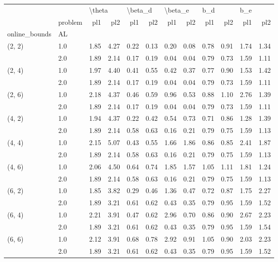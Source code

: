 \begin{tabular}{llrrrrrrrrrr}
\toprule
       & {} & \multicolumn{2}{l}{\textbackslash theta} & \multicolumn{2}{l}{\textbackslash beta\_d} & \multicolumn{2}{l}{\textbackslash beta\_e} & \multicolumn{2}{l}{b\_d} & \multicolumn{2}{l}{b\_e} \\
       & problem &    pl1 &  pl2 &     pl1 &  pl2 &     pl1 &  pl2 &  pl1 &  pl2 &  pl1 &  pl2 \\
online\_bounds & AL &        &      &         &      &         &      &      &      &      &      \\
\midrule
(2, 2) & 1.0 &   1.85 & 4.27 &    0.22 & 0.13 &    0.20 & 0.08 & 0.78 & 0.91 & 1.74 & 1.34 \\
       & 2.0 &   1.89 & 2.14 &    0.17 & 0.19 &    0.04 & 0.04 & 0.79 & 0.73 & 1.59 & 1.11 \\
(2, 4) & 1.0 &   1.97 & 4.40 &    0.41 & 0.55 &    0.42 & 0.37 & 0.77 & 0.90 & 1.53 & 1.42 \\
       & 2.0 &   1.89 & 2.14 &    0.17 & 0.19 &    0.04 & 0.04 & 0.79 & 0.73 & 1.59 & 1.11 \\
(2, 6) & 1.0 &   2.18 & 4.37 &    0.46 & 0.59 &    0.96 & 0.53 & 0.88 & 1.10 & 2.76 & 1.39 \\
       & 2.0 &   1.89 & 2.14 &    0.17 & 0.19 &    0.04 & 0.04 & 0.79 & 0.73 & 1.59 & 1.11 \\
(4, 2) & 1.0 &   1.94 & 4.37 &    0.22 & 0.42 &    0.54 & 0.73 & 0.71 & 0.86 & 1.28 & 1.39 \\
       & 2.0 &   1.89 & 2.14 &    0.58 & 0.63 &    0.16 & 0.21 & 0.79 & 0.75 & 1.59 & 1.13 \\
(4, 4) & 1.0 &   2.15 & 5.07 &    0.43 & 0.55 &    1.66 & 1.86 & 0.86 & 0.85 & 2.41 & 1.87 \\
       & 2.0 &   1.89 & 2.14 &    0.58 & 0.63 &    0.16 & 0.21 & 0.79 & 0.75 & 1.59 & 1.13 \\
(4, 6) & 1.0 &   2.06 & 4.50 &    0.64 & 0.74 &    1.85 & 1.57 & 1.05 & 1.11 & 1.81 & 1.24 \\
       & 2.0 &   1.89 & 2.14 &    0.58 & 0.63 &    0.16 & 0.21 & 0.79 & 0.75 & 1.59 & 1.13 \\
(6, 2) & 1.0 &   1.85 & 3.82 &    0.29 & 0.46 &    1.36 & 0.47 & 0.72 & 0.87 & 1.75 & 2.27 \\
       & 2.0 &   1.89 & 3.21 &    0.61 & 0.62 &    0.43 & 0.35 & 0.79 & 0.95 & 1.59 & 1.52 \\
(6, 4) & 1.0 &   2.21 & 3.91 &    0.47 & 0.62 &    2.96 & 0.70 & 0.86 & 0.90 & 2.67 & 2.23 \\
       & 2.0 &   1.89 & 3.21 &    0.61 & 0.62 &    0.43 & 0.35 & 0.79 & 0.95 & 1.59 & 1.54 \\
(6, 6) & 1.0 &   2.12 & 3.91 &    0.68 & 0.78 &    2.92 & 0.91 & 1.05 & 0.90 & 2.03 & 2.23 \\
       & 2.0 &   1.89 & 3.21 &    0.61 & 0.62 &    0.43 & 0.35 & 0.79 & 0.95 & 1.59 & 1.52 \\
\bottomrule
\end{tabular}
